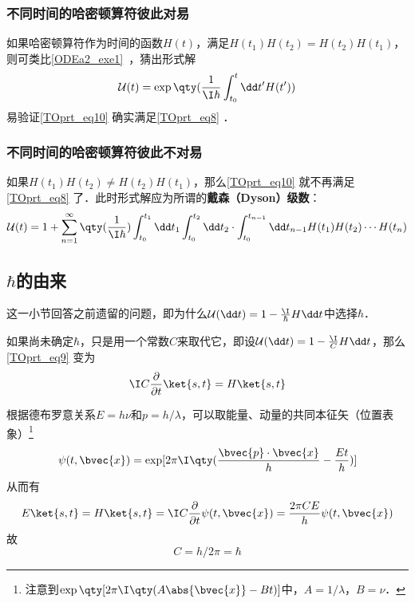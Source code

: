 \subsubsection{不同时间的哈密顿算符彼此对易}

如果哈密顿算符作为时间的函数$H(t)$，满足$H(t_1)H(t_2)=H(t_2)H(t_1)$，则可类比\autoref{ODEa2_exe1}~，猜出形式解
\begin{equation}\label{TOprt_eq10}
\mathcal{U}(t)=\exp\qty(\frac{1}{\I\hbar}\int^t_{t_0}\dd t' H(t'))
\end{equation}
易验证\autoref{TOprt_eq10} 确实满足\autoref{TOprt_eq8} ．



\subsubsection{不同时间的哈密顿算符彼此不对易}

如果$H(t_1)H(t_2)\not=H(t_2)H(t_1)$，那么\autoref{TOprt_eq10} 就不再满足\autoref{TOprt_eq8} 了．此时形式解应为所谓的\textbf{戴森（Dyson）级数}：
\begin{equation}
\mathcal{U}(t) = 1+\sum_{n=1}^\infty \qty(\frac{1}{\I \hbar})\int^{t_1}_{t_0}\dd t_1\int^{t_2}_{t_0}\dd t_2\cdot \int^{t_{n-1}}_{t_0}\dd t_{n-1}H(t_1)H(t_2)\cdots H(t_n)
\end{equation}


\subsection{$\hbar$的由来}\label{TOprt_sub1}

这一小节回答之前遗留的问题，即为什么$\mathcal{U}(\dd t) = 1-\frac{\I}{\hbar} H \dd t$中选择$\hbar$．

如果尚未确定$\hbar$，只是用一个常数$C$来取代它，即设$\mathcal{U}(\dd t) = 1-\frac{\I}{C} H \dd t$，那么\autoref{TOprt_eq9} 变为
\begin{equation}
\I C\frac{\partial}{\partial t}\ket{s, t}=H\ket{s, t}
\end{equation}

根据德布罗意关系$E=h\nu$和$p=h/\lambda$，可以取能量、动量的共同本征矢（位置表象）\footnote{注意到$\exp\qty[2\pi \I \qty(A\abs{\bvec{x}}-Bt)]$中，$A=1/\lambda$，$B=\nu$．}
\begin{equation}
\psi(t, \bvec{x})=\exp[2\pi\I\qty(\frac{\bvec{p}\cdot\bvec{x}}{h}-\frac{Et}{h})]
\end{equation}
从而有
\begin{equation}
E\ket{s, t}=H\ket{s, t}=\I C\frac{\partial}{\partial t}\psi(t, \bvec{x}) = \frac{2\pi C E}{h} \psi(t, \bvec{x})
\end{equation}
故
\begin{equation}
C=h/2\pi=\hbar
\end{equation}








